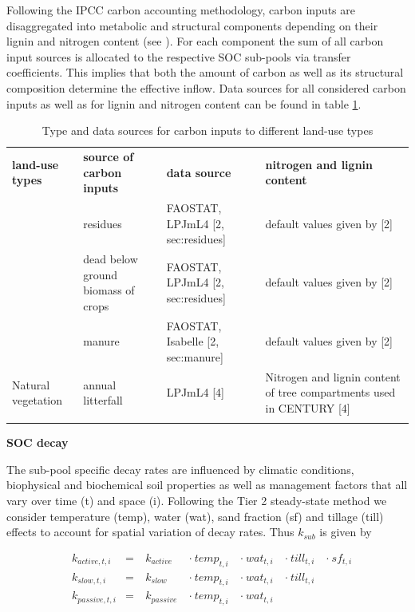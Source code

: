\documentclass[gc, manuscript]{copernicus}
\begin{document}
Following the IPCC carbon accounting methodology, carbon inputs are disaggregated into metabolic and structural components depending on their lignin and nitrogen content (see \citet{ipcc_2019_2019}). For each component the sum of all carbon input sources is allocated to the respective SOC sub-pools via transfer coefficients. This implies that both the amount of carbon as well as its structural composition determine the effective inflow. Data sources for all considered carbon inputs as well as for lignin and nitrogen content can be found in table \ref{tab:datasourceinputs}.

 \begin{table}[h]
 \caption{Type and data sources for carbon inputs to different land-use types }
 \begin{tabular}{l l l l}
 \tophline
  \textbf{land-use types}   & \textbf{source of carbon inputs} & \textbf{data source} & \textbf{nitrogen and lignin content} \\
 \middlehline
 \multirow{3}{*}{Cropland} & residues & FAOSTAT, LPJmL4 [2, sec:residues] & default values given by [2]  \\
                            & dead below ground biomass of crops & FAOSTAT, LPJmL4 [2, sec:residues] & default values given by [2] \\
                            & manure & FAOSTAT, Isabelle [2, sec:manure] & default values given by [2] \\
                            \hline
  Natural vegetation        & annual litterfall & LPJmL4 [4]& \begin{minipage}[t]{0.28\columnwidth}\raggedright\strut Nitrogen and lignin content of tree compartments used in CENTURY [4] \strut \end{minipage}\tabularnewline
 \bottomhline
 \end{tabular}
 \label{tab:datasourceinputs}
 \belowtable{}
 \end{table}

\textbf{SOC decay}

The sub-pool specific decay rates are influenced by climatic conditions, biophysical and biochemical soil properties as well as management factors that all vary over time (t) and space (i). Following the Tier 2 steady-state method we consider temperature (temp), water (wat), sand fraction (sf) and tillage (till) effects to account for spatial variation of decay rates. Thus \(k_{sub}\) is given by

\begin{equation}
\begin{aligned}
& k_{active,t,i}  & = &~ k_{active}  ~ &\cdot~ temp_{t,i} ~ &\cdot~ wat_{t,i} ~ &\cdot~ till_{t,i} ~ & \cdot~ sf_{t,i}\\
& k_{slow,t,i}    & = &~ k_{slow}    ~ &\cdot~ temp_{t,i} ~ &\cdot~ wat_{t,i} ~ &\cdot~ till_{t,i} ~ &\\
& k_{passive,t,i} & = &~ k_{passive} ~ &\cdot~ temp_{t,i} ~ &\cdot~ wat_{t,i} ~ & ~ &
\label{eq:decayrates}
\end{aligned}
\end{equation}
\end{document}
